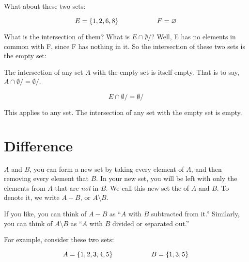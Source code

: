 \documentclass[../../../main.tex]{subfiles}
\begin{document}
What about these two sets:

\begin{equation*}
  E = \{ 1, 2, 6, 8 \} \hskip 2cm F = \emptyset/
\end{equation*}

What is the intersection of them? What is $E \cap \emptyset/$? Well, E has no elements in common with F, since F has nothing in it. So the intersection of these two sets is the empty set:

\begin{aside}
  \begin{remark}
    The intersection of any set $A$ with the empty set is itself empty. That is to say, $A \cap \emptyset/ = \emptyset/$.
  \end{remark}
\end{aside}

\begin{equation*}
  E \cap \emptyset/ = \emptyset/
\end{equation*}

This applies to any set. The intersection of any set with the empty set is empty. 


\section{Difference}

 $A$ and $B$, you can form a new set by taking every element of $A$, and then removing every element that $B$. In your new set, you will be left with only the elements from $A$ that are \emph{not} in $B$. We call this new set the  of $A$ and $B$. To denote it, we write $A - B$, or $A \setminus B$. 

\begin{aside}
  \begin{remark}
    If you like, you can think of $A - B$ as ``$A$ with $B$ subtracted from it.'' Similarly, you can think of $A \setminus B$ as ``$A$ with $B$ divided or separated out.''
  \end{remark}
\end{aside}

For example, consider these two sets:

\begin{equation*}
  A = \{ 1, 2, 3, 4, 5 \} \hskip 2cm B = \{ 1, 3, 5 \}
\end{equation*}
\end{document}
